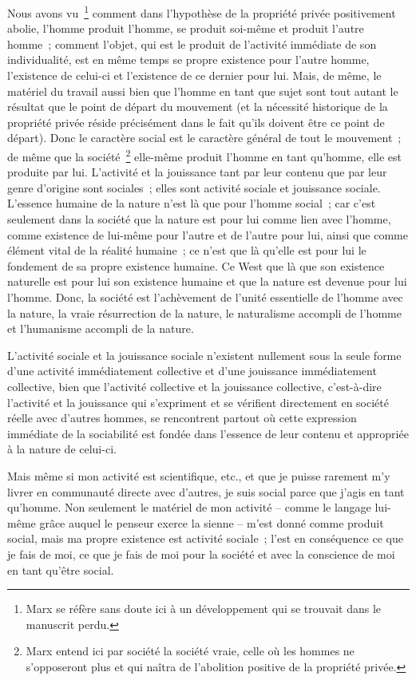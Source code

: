 \documentclass[french,twoside]{book} %
\begin{document}
Nous avons vu \footnote{Marx se réfère sans doute ici à un développement qui se trouvait dans le manuscrit perdu.} comment dans l’hypothèse de la propriété privée positivement abolie, l’homme produit l’homme, se produit soi-même et produit l’autre homme ; comment l’objet, qui est le produit de l’activité immédiate de son individualité, est en même temps se propre existence pour l’autre homme, l’existence de celui-ci et l’existence de ce dernier pour lui. Mais, de même, le matériel du travail aussi bien que l’homme en tant que sujet sont tout autant le résultat que le point de départ du mouvement (et la nécessité historique de la propriété privée réside précisément dans le fait qu’ils doivent être ce point de départ). Donc le caractère social est le caractère général de tout le mouvement ; de même que la société \footnote{Marx entend ici par société la société vraie, celle où les hommes ne s’opposeront plus et qui naîtra de l’abolition positive de la propriété privée.} elle-même produit l’homme en tant qu’homme, elle est produite par lui. L’activité et la jouissance tant par leur contenu que par leur genre d’origine sont sociales ; elles sont activité sociale et jouissance sociale. L’essence humaine de la nature n’est là que pour l’homme social ; car c’est seulement dans la société que la nature est pour lui comme lien avec l’homme, comme existence de lui-même pour l’autre et de l’autre pour lui, ainsi que comme élément vital de la réalité humaine ; ce n’est que là qu’elle est pour lui le fondement de sa propre existence humaine. Ce West que là que son existence naturelle est pour lui son existence humaine et que la nature est devenue pour lui l’homme. Donc, la société est l’achèvement de l’unité essentielle de l’homme avec la nature, la vraie résurrection de la nature, le naturalisme accompli de l’homme et l’humanisme accompli de la nature.\par
[VI] L’activité sociale et la jouissance sociale n’existent nullement sous la seule forme d’une activité immédiatement collective et d’une jouissance immédiatement collective, bien que l’activité collective et la jouissance collective, c’est-à-dire l’activité et la jouissance qui s’expriment et se vérifient directement en société réelle avec d’autres hommes, se rencontrent partout où cette expression immédiate de la sociabilité est fondée dans l’essence de leur contenu et appropriée à la nature de celui-ci.\par
Mais même si mon activité est scientifique, etc., et que je puisse rarement m’y livrer en communauté directe avec d’autres, je suis social parce que j’agis en tant qu’homme. Non seulement le matériel de mon activité – comme le langage lui-même grâce auquel le penseur exerce la sienne – m’est donné comme produit social, mais ma propre existence est activité sociale ; l’est en conséquence ce que je fais de moi, ce que je fais de moi pour la société et avec la conscience de moi en tant qu’être social.\par
\end{document}
